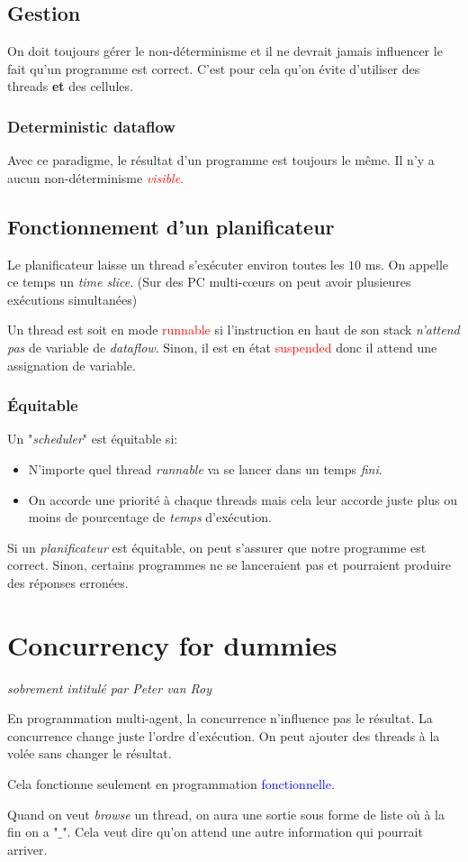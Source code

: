 \documentclass{report}
\begin{document}
\subsection{Gestion}
On doit toujours gérer le non-déterminisme et il ne devrait jamais influencer le fait qu'un programme est correct. C'est pour cela qu'on évite d'utiliser des threads \textbf{et} des cellules.

\subsubsection{Deterministic dataflow}
Avec ce paradigme, le résultat d'un programme est toujours le même. Il n'y a aucun non-déterminisme \textcolor{red}{\textit{visible}}.

\subsection{Fonctionnement d'un planificateur}
Le planificateur laisse un thread s'exécuter environ toutes les $10$ ms. On appelle ce temps un \textit{time slice}. (Sur des PC multi-cœurs on peut avoir plusieures exécutions simultanées)\par
Un thread est soit en mode \textcolor{red}{runnable} si l'instruction en haut de son stack \textit{n'attend pas} de variable de \textit{dataflow}. Sinon, il est en état \textcolor{red}{suspended} donc il attend une assignation de variable.

\subsubsection{Équitable}
Un "\textit{scheduler}" est équitable si:
\begin{itemize}
\item N'importe quel thread \textit{runnable} va se lancer dans un temps \textit{fini}.
\item On accorde une priorité à chaque threads mais cela leur accorde juste plus ou moins de pourcentage de \textit{temps} d'exécution.
\end{itemize}
Si un \textit{planificateur} est équitable, on peut s'assurer que notre programme est correct. Sinon, certains programmes ne se lanceraient pas et pourraient produire des réponses erronées.

\section{Concurrency for dummies}
\noindent
\textit{sobrement intitulé par Peter van Roy}\par
En programmation multi-agent, la concurrence n'influence pas le résultat. La concurrence change juste l'ordre d'exécution. On peut ajouter des threads à la volée sans changer le résultat.\par
Cela fonctionne seulement en programmation \textcolor{blue}{fonctionnelle}.\par
Quand on veut \textit{browse} un thread, on aura une sortie sous forme de liste où à la fin on a "$\_$". Cela veut dire qu'on attend une autre information qui pourrait arriver.
\end{document}
